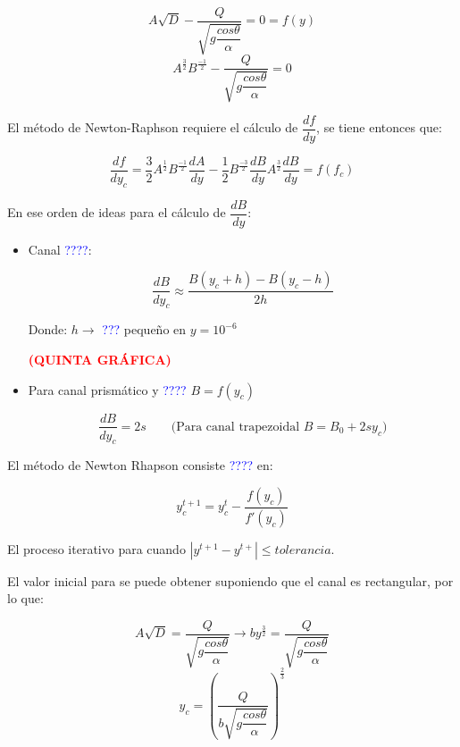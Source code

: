 \documentclass[a4paper, 11pt]{article}
\begin{document}
$$A\sqrt{D}-\dfrac{Q}{\sqrt{g\dfrac{cos\theta}{\alpha}}}=0=f(y)$$
$$A^{\frac{3}{2}}B^{\frac{-1}{2}}-\dfrac{Q}{\sqrt{g\dfrac{cos\theta}{\alpha}}}=0$$

El método de Newton-Raphson requiere el cálculo de $\dfrac{df}{dy}$, se tiene entonces que:


$$\dfrac{df}{dy_{c}}=\dfrac{3}{2}A^{\frac{1}{2}}B^{\frac{-1}{2}}\dfrac{dA}{dy}-\dfrac{1}{2}B^{\frac{-3}{2}}\dfrac{dB}{dy}A^{\frac{3}{2}}\dfrac{dB}{dy}=f(f_{c})$$


En ese orden de ideas para el cálculo de $\dfrac{dB}{dy}$:


\begin{itemize}
    \item Canal \textcolor{blue}{????}:

    $$\dfrac{dB}{dy_{c}}\approx\dfrac{B(y_{c}+h)-B(y_c-h)}{2h}$$

    Donde: $h\rightarrow$ \textcolor{blue}{???} pequeño en $y=10^{-6}$

    \textcolor{red}{\textbf{(QUINTA GRÁFICA)}} \vspace{1ex}

    \item Para canal prismático y \textcolor{blue}{????} $B=f(y_{c})$

    $$\dfrac{dB}{dy_{c}}=2s \qquad \text{(Para canal trapezoidal $B=B_{0}+2sy_{c}$)}$$

\end{itemize}

El método de Newton Rhapson consiste \textcolor{blue}{????} en:

$$y^{t+1}_{c}=y^{t}_{c}-\dfrac{f(y_c)}{f'(y_c)}$$

El proceso iterativo para cuando $|y^{t+1}-y^{t+}|\leq tolerancia$.

El valor inicial para se puede obtener suponiendo que el canal es rectangular, por lo que:

$$A\sqrt{D}=\dfrac{Q}{\sqrt{g\dfrac{cos\theta}{\alpha}}}\rightarrow by^{\frac{3}{2}}=\dfrac{Q}{\sqrt{g\dfrac{cos\theta}{\alpha}}}$$
$$y_{c}=\left(\dfrac{Q}{b\sqrt{g\dfrac{cos\theta}{\alpha}}}\right)^{\frac{2}{3}}$$
\end{document}

